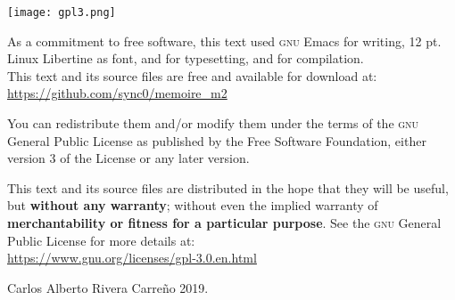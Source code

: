 \newpage
\begin{center}
\vspace*{\fill}
\noindent
\texttt{[image: gpl3.png]}\par
\vspace{1\baselineskip}

As a commitment to free software, this text used  \textsc{gnu}
Emacs for writing, 12 pt. Linux Libertine as font,  \hologo{\fmtname}
and \KOMAScript for typesetting, and   for compilation.\\
\vspace{1\baselineskip}
This text and its source files are free and available for download at:\\
\vspace{1\baselineskip}
\url{https://github.com/sync0/memoire_m2}
\vspace{1\baselineskip}

\noindent You can redistribute them and/or modify them under the terms of
the \textsc{gnu} General Public License as published by the Free Software
Foundation, either version 3 of the License or any later version.

This text and its source files are distributed in the hope that they will
be useful, but \textbf{without any warranty}; without even the implied
warranty of \textbf{merchantability or fitness for a particular purpose}.
See the \textsc{gnu} General Public License for more details at:\\ 
\vspace{1\baselineskip}
\url{https://www.gnu.org/licenses/gpl-3.0.en.html} 

\vspace{1\baselineskip}
\noindent
\textcopyright Carlos Alberto Rivera Carreño 2019.
\end{center}




\newpage 


\newpage
\tableofcontents 